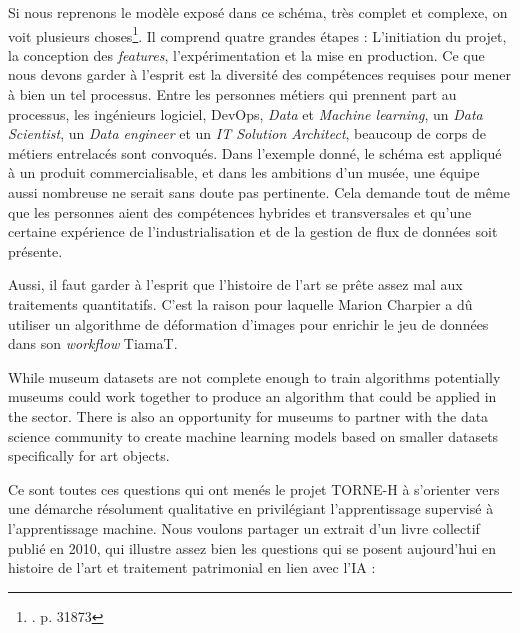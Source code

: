 Si nous reprenons le modèle exposé dans ce schéma, très complet et complexe, on voit plusieurs choses\footnote{\cite{kreuzberger_machine_2023}. p. 31873}. Il comprend quatre grandes étapes : L'initiation du projet, la conception des \textit{features}, l'expérimentation et la mise en production. Ce que nous devons garder à l'esprit est la diversité des compétences requises pour mener à bien un tel processus. Entre les personnes métiers qui prennent part au processus, les ingénieurs logiciel, DevOps, \textit{Data} et \textit{Machine learning}, un \textit{Data Scientist}, un \textit{Data engineer} et un \textit{IT Solution Architect}, beaucoup de corps de métiers entrelacés sont convoqués. Dans l'exemple donné, le schéma est appliqué à un produit commercialisable, et dans les ambitions d'un musée, une équipe aussi nombreuse ne serait sans doute pas pertinente. Cela demande tout de même que les personnes aient des compétences hybrides et transversales et qu'une certaine expérience de l'industrialisation et de la gestion de flux de données soit présente.

Aussi, il faut garder à l'esprit que l'histoire de l'art se prête assez mal aux traitements quantitatifs. C'est la raison pour laquelle Marion Charpier a dû utiliser un algorithme de déformation d'images pour enrichir le jeu de données dans son \textit{workflow} TiamaT.

\vspace{1em}
\noindent
\hspace*{1cm}
\begin{minipage}{\dimexpr\linewidth-2cm}
\fontsize{10}{12}\selectfont
While museum datasets are not complete enough to train algorithms potentially museums could work together to produce an algorithm that could be applied in the sector. There is also an opportunity for museums to partner with the data science community to create machine learning models based on smaller datasets specifically for art objects.                                                  \footnotemark{}
\end{minipage}
\vspace{1em}

Ce sont toutes ces questions qui ont menés le projet TORNE-H à s'orienter vers une démarche résolument qualitative en privilégiant l'apprentissage supervisé à l'apprentissage machine. Nous voulons partager un extrait d'un livre collectif publié en 2010, qui illustre assez bien les questions qui se posent aujourd'hui en histoire de l'art et traitement patrimonial en lien avec l'IA : 

